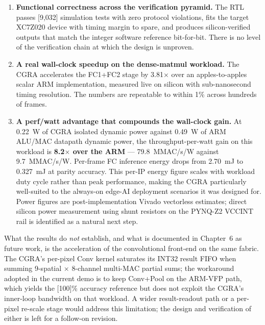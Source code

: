 \begin{enumerate}[leftmargin=1.4cm,itemsep=4pt,topsep=2pt]
\item \textbf{Functional correctness across the verification
pyramid.} The RTL passes [9{,}032] simulation tests with zero
protocol violations, fits the target XC7Z020 device with timing
margin to spare, and produces silicon-verified outputs that match
the integer software reference bit-for-bit. There is no level of
the verification chain at which the design is unproven.
\item \textbf{A real wall-clock speedup on the dense-matmul
workload.} The CGRA accelerates the FC1+FC2 stage by
3.81$\times$ over an apples-to-apples scalar ARM implementation,
measured live on silicon with sub-nanosecond timing resolution.
The numbers are repeatable to within 1\% across hundreds of frames.
\item \textbf{A perf/watt advantage that compounds the wall-clock
gain.} At 0.22~W of CGRA isolated dynamic power against 0.49~W
of ARM ALU/MAC datapath dynamic power, the throughput-per-watt
gain on this workload is \textbf{8.2$\times$ over the ARM} ---
79.8~MMAC/s/W against 9.7~MMAC/s/W. Per-frame FC inference energy
drops from 2.70~mJ to 0.327~mJ at parity accuracy. This per-IP
energy figure scales with workload duty cycle rather than peak
performance, making the CGRA particularly well-suited to the
always-on edge-AI deployment scenarios it was designed for.
Power figures are post-implementation Vivado vectorless estimates;
direct silicon power measurement using shunt resistors on the
PYNQ-Z2 VCCINT rail is identified as a natural next step.
\end{enumerate}

\noindent What the results do \emph{not} establish, and what is
documented in Chapter~6 as future work, is the acceleration of the
convolutional front-end on the same fabric. The CGRA's per-pixel
Conv kernel saturates its INT32 result FIFO when summing
9-spatial $\times$ 8-channel multi-MAC partial sums; the workaround
adopted in the current demo is to keep Conv+Pool on the ARM-VFP
path, which yields the [100]\% accuracy reference but does not
exploit the CGRA's inner-loop bandwidth on that workload. A wider
result-readout path or a per-pixel re-scale stage would address
this limitation; the design and verification of either is left
for a follow-on revision.

